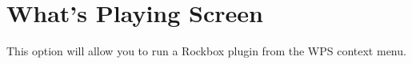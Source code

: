 
\section{\label{ref:WPSSettings}What's Playing Screen}

  \begin{description}
  \item[Set WPS Context Plugin.]
  This option will allow you to run a Rockbox plugin from the WPS context menu.
   \end{description}
